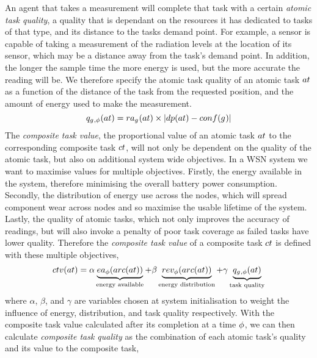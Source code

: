 An agent that takes a measurement will complete that task with a certain \textit{atomic task quality}, a quality that is dependant on the resources it has dedicated to tasks of that type, and its distance to the tasks demand point. For example, a sensor is capable of taking a measurement of the radiation levels at the location of its sensor, which may be a distance away from the task's demand point. In addition, the longer the sample time the more energy is used, but the more accurate the reading will be. We therefore specify the atomic task quality of an atomic task $\varAtomicTask{}{}$ as a function of the distance of the task from the requested position, and the amount of energy used to make the measurement.
\begin{equation}
\label{eq:atomic_task_quality}
	\functionAtomicTaskQualitySignature{}{} = \functionTaskResourceAllocation{}{} \times \funcSize{
			\functionTaskDemandPoint{}{} - \functionDeployment{\varAgent{}{}}{}
	}{}
\end{equation}
The \textit{composite task value}, the proportional value of an atomic task $\varAtomicTask{}{}$ to the corresponding composite task $\varCompositeTask{}{}$, will not only be dependent on the quality of the atomic task, but also on additional system wide objectives. In a WSN system we want to maximise values for multiple objectives. Firstly, the energy available in the system, therefore minimising the overall battery power consumption. Secondly, the distribution of energy use across the nodes, which will spread component wear across nodes and so maximise the usable lifetime of the system. Lastly, the quality of atomic tasks, which not only improves the accuracy of readings, but will also invoke a penalty of poor task coverage as failed tasks have lower quality. Therefore the \textit{composite task value} of a composite task $\varCompositeTask{}{}$ is defined with these multiple objectives,
\begin{equation}
	\label{eq:ctv}
	\functionCompositeTaskValue{}{} = 
	\alpha\underbrace{\functionEnergyAvailable{\functionTaskArc{}{}}{}}_{\text{energy available}}
	+ \beta\underbrace{\functionEnergyVariability{\functionTaskArc{}{}}{}}_{\text{energy distribution}}
	+ 
	\gamma\underbrace{\functionAtomicTaskQualitySignature{}{}}_{\text{task quality}}
\end{equation}
where $\alpha$, $\beta$, and $\gamma$ are variables chosen at system initialisation to weight the influence of energy, distribution, and task quality respectively. With the composite task value calculated after its completion  at a time $\phi$, we can then calculate \textit{composite task quality} as the combination of each atomic task's quality and its value to the composite task,
